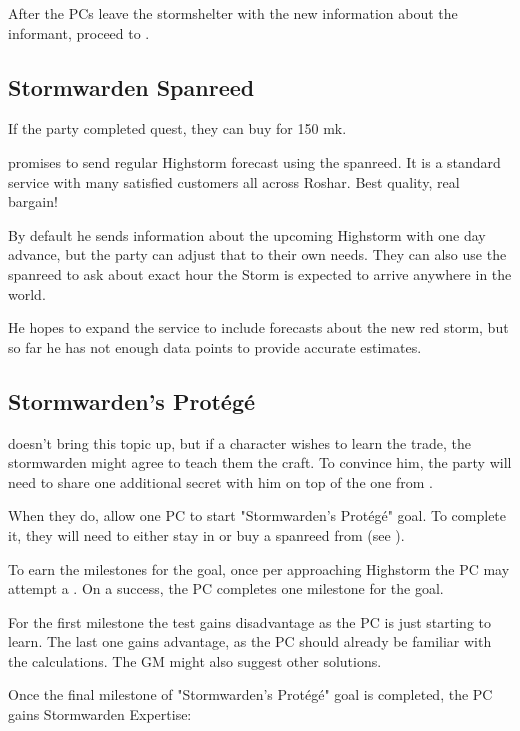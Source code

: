 After the PCs leave the stormshelter with the new information about the informant, proceed to .



\subsection{Stormwarden Spanreed}
\label{ssec:stormshelterSpanreed}

If the party completed  quest, they can buy \lootSpanreedStormwarden{} for 150 mk.

\npcStormwarden{} promises to send regular Highstorm forecast using the spanreed. It is a standard service with many satisfied customers all across Roshar. Best quality, real bargain!

By default he sends information about the upcoming Highstorm with one day advance, but the party can adjust that to their own needs. They can also use the spanreed to ask about exact hour the Storm is expected to arrive anywhere in the world.

He hopes to expand the service to include forecasts about the new red storm, but so far he has not enough data points to provide accurate estimates.



\subsection{Stormwarden's Prot\'eg\'e}

\npcStormwarden{} doesn't bring this topic up, but if a character wishes to learn the trade, the stormwarden might agree to teach them the craft. To convince him, the party will need to share one additional secret with him on top of the one from .

When they do, allow one PC to start "Stormwarden's Prot\'eg\'e" goal. To complete it, they will need to either stay in \locationYeddaw{} or buy a spanreed from \npcStormwarden{} (see ).

To earn the milestones for the goal, once per approaching Highstorm the PC may attempt a . On a success, the PC completes one milestone for the goal.

For the first milestone the test gains disadvantage as the PC is just starting to learn. The last one gains advantage, as the PC should already be familiar with the calculations. The GM might also suggest other solutions.

Once the final milestone of "Stormwarden's Prot\'eg\'e" goal is completed, the PC gains Stormwarden Expertise:


